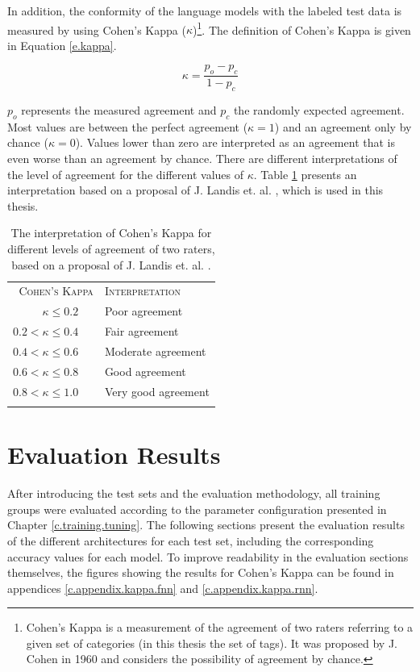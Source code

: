 In addition, the conformity of the language models with the labeled test data is measured by using Cohen's Kappa ($\kappa$)\footnote{Cohen's Kappa is a measurement of the agreement of two raters referring to a given set of categories (in this thesis the set of tags). It was proposed by J. Cohen in 1960 \cite{cohen1960} and considers the possibility of agreement by chance.}. The definition of Cohen's Kappa is given in Equation \ref{e.kappa}.

\begin{equation}
\kappa = \frac{p_o - p_c}{1 - p_c} \label{e.kappa}
\end{equation}

$p_o$ represents the measured agreement and $p_c$ the randomly expected agreement. Most values are between the perfect agreement ($\kappa = 1$) and an agreement only by chance ($\kappa = 0$). Values lower than zero are interpreted as an agreement that is even worse than an agreement by chance. There are different interpretations of the level of agreement for the different values of $\kappa$. Table \ref{t.evaluation.kappa} presents an interpretation based on a proposal of J. Landis et. al. \cite{landis1977}, which is used in this thesis.

\begin{table}[!ht]
	\centering\small{}\begin{tabular}{ r l }
	\trule
	\textsc{Cohen's Kappa} & \textsc{Interpretation} \\
	\srule
	$\kappa \leq 0.2$ \ \ & Poor agreement \\
	\mrule
	$0.2 < \kappa \leq 0.4$ \ \ & Fair agreement \\
	\mrule
	$0.4 < \kappa \leq 0.6$ \ \ & Moderate agreement \\
	\mrule
	$0.6 < \kappa \leq 0.8$ \ \ & Good agreement \\
	\mrule
	$0.8 < \kappa \leq 1.0$ \ \ & Very good agreement \\
	\brule
	\end{tabular}
	\vspace{.8em}
	\caption[Interpretation of Cohen's Kappa]{The interpretation of Cohen's Kappa for different levels of agreement of two raters, based on a proposal of J. Landis et. al. \cite{landis1977}.}
	\label{t.evaluation.kappa}
\end{table}

\section{Evaluation Results}\label{c.evaluation.results}
After introducing the test sets and the evaluation methodology, all training groups were evaluated according to the parameter configuration presented in Chapter \ref{c.training.tuning}. The following sections present the evaluation results of the different architectures for each test set, including the corresponding accuracy values for each model. To improve readability in the evaluation sections themselves, the figures showing the results for Cohen's Kappa can be found in appendices \ref{c.appendix.kappa.fnn} and \ref{c.appendix.kappa.rnn}.

